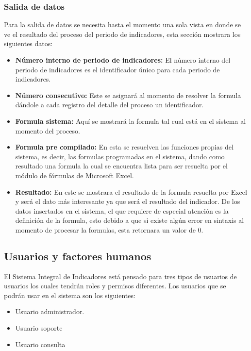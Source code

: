 			\subsubsection{Salida de datos}

				Para la salida de datos se necesita hasta el momento una sola vista en donde se ve el resultado del proceso del periodo de indicadores, esta secci\'on mostrara los siguientes datos:
				\begin{itemize}
					\item \textbf{N\'umero interno de periodo de indicadores:} El n\'umero interno del periodo de indicadores es el identificador \'unico para cada periodo de indicadores.
					\item \textbf{N\'umero consecutivo:} Este se asignar\'a al momento de resolver la formula d\'andole a cada registro del detalle del proceso un identificador.
					\item \textbf{Formula sistema:} Aqu\'i se mostrar\'a la formula tal cual est\'a en el sistema al momento del proceso.
					\item \textbf{Formula pre compilado:} En esta se resuelven las funciones propias del sistema, es decir, las formulas programadas en el sistema, dando como resultado una formula la cual se encuentra lista para ser resuelta por el m\'odulo de f\'ormulas de Microsoft Excel.
					\item \textbf{Resultado:} En este se mostrara el resultado de la formula resuelta por Excel y ser\'a el dato m\'as interesante ya que ser\'a el resultado del indicador.
					De los datos insertados en el sistema, el que requiere de especial atenci\'on es la definici\'on de la formula, esto debido a que si existe alg\'un error en sintaxis al momento de procesar la formulas, esta retornara un valor de 0.
				\end{itemize}

		\subsection{Usuarios y factores humanos}

			El Sistema Integral de Indicadores est\'a pensado para tres tipos de usuarios de usuarios los cuales tendr\'an roles y permisos diferentes. Los usuarios que se podr\'an usar en el sistema son los siguientes:

			\begin{itemize}
				\item Usuario administrador.
				\item Usuario soporte
				\item Usuario consulta
			\end{itemize}

